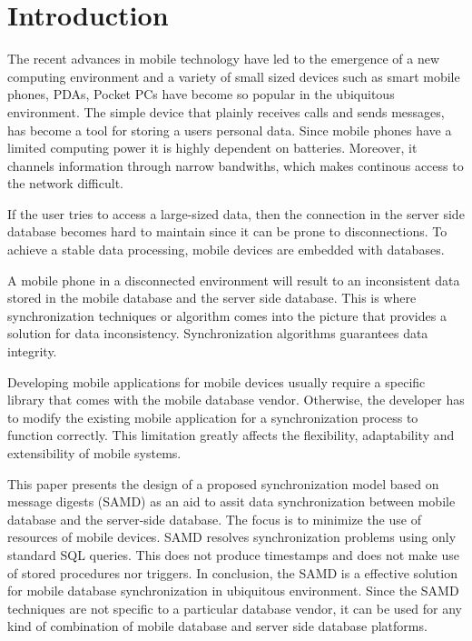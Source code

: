 \documentclass[conference]{IEEEtran}
\begin{document}

\section{Introduction}
The recent advances in mobile technology have led to the emergence of a new computing environment and a variety of small sized devices such as smart mobile phones, PDAs, Pocket PCs have become so popular in the ubiquitous environment. The simple device that plainly receives calls and sends messages, has become a tool for storing a users personal data. Since mobile phones have a limited computing power it is highly dependent on batteries. Moreover, it channels information through narrow bandwiths, which makes continous access to the network difficult.

If the user tries to access a large-sized data, then the connection in the server side database becomes hard to maintain since it can be prone to disconnections. To achieve a stable data processing, mobile devices are embedded with databases. 

A mobile phone in a disconnected environment will result to an inconsistent data stored in the mobile database and the server side database. This is where synchronization techniques or algorithm comes into the picture that provides a solution for data inconsistency. Synchronization algorithms guarantees data integrity.

Developing mobile applications for mobile devices usually require a specific library that comes with the mobile database vendor. Otherwise, the developer has to modify the existing mobile application for a synchronization process to function correctly. This limitation greatly affects the flexibility, adaptability and extensibility of mobile systems.

This paper presents the design of a proposed synchronization model based on message digests (SAMD) as an aid to assit data synchronization between mobile database and the server-side database. The focus is to minimize the use of resources of mobile devices. SAMD resolves synchronization problems using only standard SQL queries. This does not produce timestamps and does not make use of stored procedures nor triggers. In conclusion, the SAMD is a effective solution for mobile database synchronization in ubiquitous environment. Since the SAMD techniques are not specific to a particular database vendor, it can be used for any kind of combination of mobile database and server side database platforms.
\end{document}
